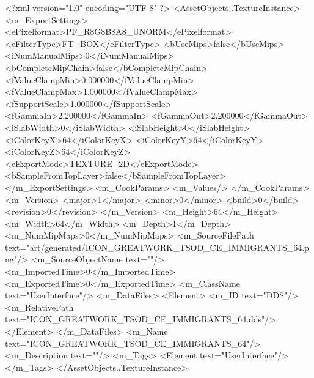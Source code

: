 <?xml version="1.0" encoding="UTF-8" ?>
<AssetObjects..TextureInstance>
	<m_ExportSettings>
		<ePixelformat>PF_R8G8B8A8_UNORM</ePixelformat>
		<eFilterType>FT_BOX</eFilterType>
		<bUseMips>false</bUseMips>
		<iNumManualMips>0</iNumManualMips>
		<bCompleteMipChain>false</bCompleteMipChain>
		<fValueClampMin>0.000000</fValueClampMin>
		<fValueClampMax>1.000000</fValueClampMax>
		<fSupportScale>1.000000</fSupportScale>
		<fGammaIn>2.200000</fGammaIn>
		<fGammaOut>2.200000</fGammaOut>
		<iSlabWidth>0</iSlabWidth>
		<iSlabHeight>0</iSlabHeight>
		<iColorKeyX>64</iColorKeyX>
		<iColorKeyY>64</iColorKeyY>
		<iColorKeyZ>64</iColorKeyZ>
		<eExportMode>TEXTURE_2D</eExportMode>
		<bSampleFromTopLayer>false</bSampleFromTopLayer>
	</m_ExportSettings>
	<m_CookParams>
		<m_Values/>
	</m_CookParams>
	<m_Version>
		<major>1</major>
		<minor>0</minor>
		<build>0</build>
		<revision>0</revision>
	</m_Version>
	<m_Height>64</m_Height>
	<m_Width>64</m_Width>
	<m_Depth>1</m_Depth>
	<m_NumMipMaps>0</m_NumMipMaps>
	<m_SourceFilePath text="art/generated/ICON_GREATWORK_TSOD_CE_IMMIGRANTS_64.png"/>
	<m_SourceObjectName text=""/>
	<m_ImportedTime>0</m_ImportedTime>
	<m_ExportedTime>0</m_ExportedTime>
	<m_ClassName text="UserInterface"/>
	<m_DataFiles>
		<Element>
			<m_ID text="DDS"/>
			<m_RelativePath text="ICON_GREATWORK_TSOD_CE_IMMIGRANTS_64.dds"/>
		</Element>
	</m_DataFiles>
	<m_Name text="ICON_GREATWORK_TSOD_CE_IMMIGRANTS_64"/>
	<m_Description text=""/>
	<m_Tags>
		<Element text="UserInterface"/>
	</m_Tags>
</AssetObjects..TextureInstance>

